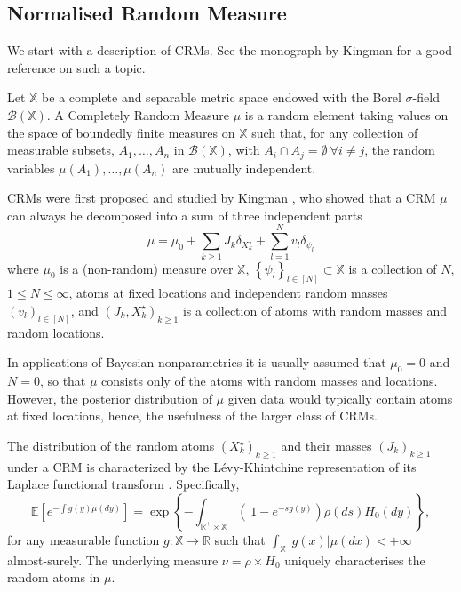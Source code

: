 \subsection{Normalised Random Measure}
We start with a description of \glspl{CRM}.
See the monograph by Kingman \cite{kingman-poisson-processes} for a good reference on such a topic. \\

\begin{definition} \label{def:CRM}
Let $\mathbb{X}$ be a complete and separable metric space endowed with the Borel $\sigma$-field $\mathcal{B}(\mathbb{X})$. A Completely Random Measure $\mu$ is a random element taking values on the space of boundedly finite measures on $\mathbb{X}$ such that, for any collection of measurable subsets, $A_1, \dots , A_n$ in $\mathcal{B}(\mathbb{X})$, with $A_i \cap  A_j = \emptyset \ \forall i \neq j$, the random variables $\mu(A_1), \dots, \mu(A_n)$ are mutually independent.
\end{definition}

\glspl{CRM} were first proposed and studied by Kingman \cite{Kingman:1967kn}, who showed that a \gls{CRM} $\mu$ can always be decomposed into a sum of three independent parts
$$ \mu = \mu_0 + \sum_{k \ge 1}{J_k \delta_{X^\star_k}} + \sum_{l=1}^N{v_l \delta_{\psi_l}} $$
where $\mu_0$ is a (non-random) measure over $\mathbb{X}$, $\left\{ \psi_l \right\}_{l \in [N]} \subset  \mathbb{X}$ is a collection of $N$, $1 \le N \le \infty$, atoms at fixed locations and independent random masses $\left(v_l \right)_{l \in [N]}$, and $\left(J_k, X^\star_k \right)_{k \ge 1}$ is a collection of atoms with random masses and random locations.

In applications of Bayesian nonparametrics it is usually assumed that $\mu_0 = 0$ and $N = 0$, so that $\mu$ consists only of the atoms with random masses and locations. However, the posterior distribution of $\mu$ given data would typically contain atoms at fixed locations, hence, the usefulness of the larger class of \glspl{CRM}.

The distribution of the random atoms $\left(X^\star_k \right)_{k \ge 1}$ and their masses $\left(J_k \right)_{k \ge 1}$ under a \gls{CRM} is characterized by the Lévy-Khintchine representation of its Laplace functional transform \cite{Kingman:1967kn}. Specifically,
\begin{equation} \label{eq:levy}
\mathbb{E} \left[e^{-\int g(y)\mu(dy)} \right] = \exp \left\{ - \int_{\mathbb{R}^+ \times \mathbb{X}} \left( \  1 - e^{-sg(y)} \right) \rho(ds) H_0(dy) \right\},
\end{equation}
for any measurable function $g: \mathbb{X} \rightarrow \mathbb{R}$ such that $\int_{\mathbb{X}}|g(x)|\mu(dx)<+ \infty$ almost-surely.
The underlying measure $\nu = \rho \times H_0$ uniquely characterises the random atoms in $\mu$.

